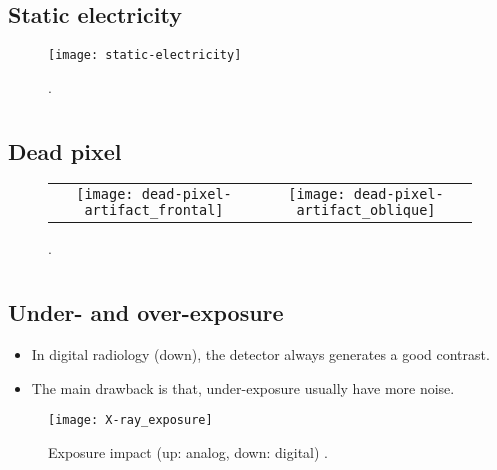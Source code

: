 \subsection{Static electricity}
\vspace{-3ex}
\begin{figure}[!h]
  \centering
  \texttt{[image: static-electricity]}
  \caption{\cite{radiopaedia}.\label{fig:static_electricity}}
\end{figure}

\section*{}
\subsection{Dead pixel}
\vspace{-3ex}
\begin{figure}[!h]
  \centering
  \begin{tabular}{cc}
    \texttt{[image: dead-pixel-artifact\_frontal]} &
                                                               \texttt{[image: dead-pixel-artifact\_oblique]}
  \end{tabular}                                                
  \caption{\cite{radiopaedia}.\label{fig:dead_pixel}}
\end{figure}

\section*{}
\subsection{Under- and over-exposure}
\begin{itemize}
\item In digital radiology (down), the detector always generates a good contrast.
\item The main drawback is that, under-exposure usually have more noise.
\end{itemize}
\vspace{-4ex}
\begin{figure}[!h]
  \centering
    \texttt{[image: X-ray\_exposure]}
    \caption{Exposure impact (up: analog, down: digital)
      \cite{VELDKAMP2009209}.\label{fig:exposure}}
\end{figure}

